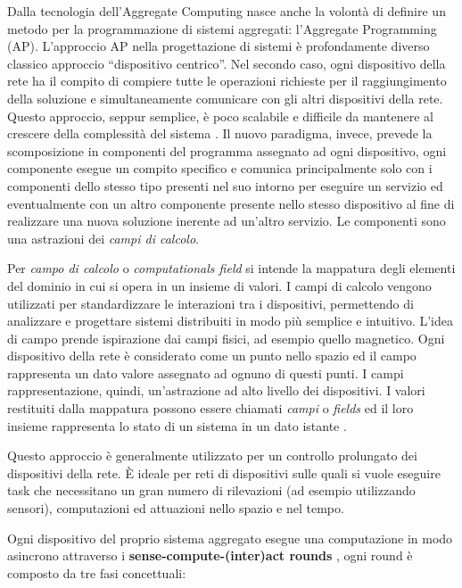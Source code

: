 \documentclass[12pt,a4paper,openright,twoside]{book}
\begin{document}
Dalla tecnologia dell'Aggregate Computing nasce anche la volontà di definire un metodo per la programmazione di sistemi aggregati: l'Aggregate Programming (AP). 
L'approccio \ac{AP} nella progettazione di sistemi è profondamente diverso classico approccio ``dispositivo centrico''.
Nel secondo caso, ogni dispositivo della rete ha il compito di compiere tutte le operazioni richieste per il raggiungimento della soluzione e simultaneamente comunicare con gli altri dispositivi della rete. Questo approccio, seppur semplice, è poco scalabile e difficile da mantenere al crescere della complessità del sistema \cite{Pianini2017}. 
Il nuovo paradigma, invece, prevede la scomposizione in componenti del programma assegnato ad ogni dispositivo, ogni componente esegue un compito specifico e comunica principalmente solo con i componenti dello stesso tipo presenti nel suo intorno per eseguire un servizio ed eventualmente con un altro componente presente nello stesso dispositivo al fine di realizzare una nuova soluzione inerente ad un'altro servizio. Le componenti sono una astrazioni dei \textit{campi di calcolo}.

Per \textit{campo di calcolo} o \textit{computationals field} si intende la mappatura degli elementi del dominio in cui si opera in un insieme di valori.
I campi di calcolo vengono utilizzati per standardizzare le interazioni tra i dispositivi, permettendo di analizzare e progettare sistemi distribuiti in modo più semplice e intuitivo. L'idea di campo prende ispirazione dai campi fisici, ad esempio quello magnetico. Ogni dispositivo della rete è considerato come un punto nello spazio ed il campo rappresenta un dato valore assegnato ad ognuno di questi punti. I campi rappresentazione, quindi, un'astrazione ad alto livello dei dispositivi. I valori restituiti dalla mappatura possono essere chiamati \textit{campi} o \textit{fields} ed il loro insieme rappresenta lo stato di un sistema in un dato istante \cite{Audrito2019}.

Questo approccio è generalmente utilizzato per un controllo prolungato dei dispositivi della rete. È ideale per reti di dispositivi sulle quali si vuole eseguire task che necessitano un gran numero di rilevazioni (ad esempio utilizzando sensori), computazioni ed attuazioni nello spazio e nel tempo.

Ogni dispositivo del proprio sistema aggregato esegue una computazione in modo asincrono attraverso i \textbf{sense-compute-(inter)act rounds}\label{sec:sense-compute-interact} \cite{Macroswarm}, ogni round è composto da tre fasi concettuali:
\end{document}

